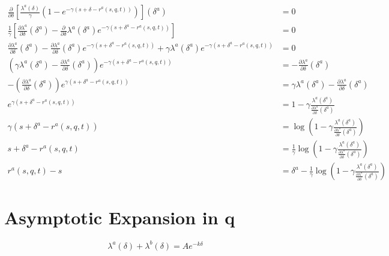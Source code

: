\begin{align*}
    \frac{\partial}{\partial\delta}\left[\frac{\lambda^a(\delta)}{\gamma}(1-e^{-\gamma(s+\delta-r^a(s,q,t))})\right](\delta^a)&=0\\
    \frac{1}{\gamma}\left[\frac{\partial\lambda^a}{\partial\delta}(\delta^a)-\frac{\partial}{\partial\delta}\lambda^a(\delta^a)e^{-\gamma(s+\delta^a-r^a(s,q,t))}\right]&=0\\
    \frac{\partial\lambda^a}{\partial\delta}(\delta^a)-\frac{\partial\lambda^a}{\partial\delta}(\delta^a)e^{-\gamma(s+\delta^a-r^a(s,q,t))}+\gamma\lambda^a(\delta^a)e^{-\gamma(s+\delta^a-r^a(s,q,t))}&=0\\
    \left(\gamma\lambda^a(\delta^a)-\frac{\partial\lambda^a}{\partial\delta}(\delta^a)\right)e^{-\gamma(s+\delta^a-r^a(s,q,t))}&=-\frac{\partial\lambda^a}{\partial\delta}(\delta^a)\\
    -\left(\frac{\partial\lambda^a}{\partial\delta}(\delta^a)\right)e^{\gamma(s+\delta^a-r^a(s,q,t))}&=\gamma\lambda^a(\delta^a)-\frac{\partial\lambda^a}{\partial\delta}(\delta^a)\\
    e^{\gamma(s+\delta^a-r^a(s,q,t))}&=1-\gamma\frac{\lambda^a(\delta^a)}{\frac{\partial\lambda^a}{\partial\delta}(\delta^a)}\\
    \gamma(s+\delta^a-r^a(s,q,t))&=\log\left(1-\gamma\frac{\lambda^a(\delta^a)}{\frac{\partial\lambda^a}{\partial\delta}(\delta^a)}\right)\\
    s+\delta^a-r^a(s,q,t)&=\frac{1}{\gamma}\log\left(1-\gamma\frac{\lambda^a(\delta^a)}{\frac{\partial\lambda^a}{\partial\delta}(\delta^a)}\right)\\
    r^a(s,q,t)-s&=\delta^a-\frac{1}{\gamma}\log\left(1-\gamma\frac{\lambda^a(\delta^a)}{\frac{\partial\lambda^a}{\partial\delta}(\delta^a)}\right)
\end{align*}

\section{Asymptotic Expansion in q}\label{sec:3.8}
\begin{equation}
    \lambda^a(\delta)+\lambda^b(\delta)=Ae^{-k\delta}
\end{equation}

